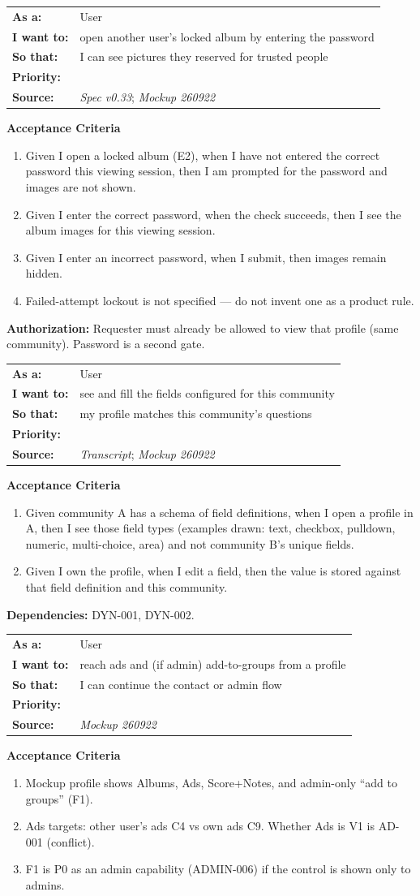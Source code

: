 \documentclass[11pt,a4paper]{article}
\makeatletter
\newcommand{\priPzero}{\colorbox{p0}{\makebox[4.6em]{\textcolor{white}{\scriptsize\bfseries P0 V1}}}}
\newcommand{\priPone}{\colorbox{p1}{\makebox[4.6em]{\textcolor{white}{\scriptsize\bfseries P1}}}}
\newcommand{\srcSpec}{\textit{Spec v0.33}}
\newcommand{\srcTx}{\textit{Transcript}}
\newcommand{\srcMock}{\textit{Mockup 260922}}
\newenvironment{story}[1]{%
  \Needspace{10\baselineskip}%
  \vspace{0.7em}%
  \noindent
  \colorbox{navy}{\makebox[\dimexpr\textwidth-2\fboxsep\relax][l]{\textcolor{white}{\bfseries\ #1}}}%
  \par\vspace{0.35em}%
}{\par\vspace{0.55em}}
\newcommand{\storymeta}[5]{%
  \noindent
  \begin{tabularx}{\textwidth}{@{}>{\bfseries}l X@{}}
    As a: & #1 \\
    I want to: & #2 \\
    So that: & #3 \\
    Priority: & #4 \\
    Source: & #5 \\
  \end{tabularx}
  \par\vspace{0.3em}
}
\newcommand{\achead}{\noindent\textbf{Acceptance Criteria}\par}
\newcommand{\authz}[1]{\noindent\textbf{Authorization:} #1\par}
\newcommand{\deps}[1]{\noindent\textbf{Dependencies:} #1\par}
\makeatother
\begin{document}
\begin{story}{PROF-014 --- View another user's locked album}
\storymeta{User}{open another user's locked album by entering the password}{I can see pictures they reserved for trusted people}{\priPzero}{\srcSpec; \srcMock}
\achead
\begin{enumerate}
  \item Given I open a locked album (E2), when I have not entered the correct password this viewing session, then I am prompted for the password and images are not shown.
  \item Given I enter the correct password, when the check succeeds, then I see the album images for this viewing session.
  \item Given I enter an incorrect password, when I submit, then images remain hidden.
  \item Failed-attempt lockout is not specified --- do not invent one as a product rule.
\end{enumerate}
\authz{Requester must already be allowed to view that profile (same community). Password is a second gate.}
\end{story}

\begin{story}{PROF-015 --- Dynamic fields render on the profile}
\storymeta{User}{see and fill the fields configured for this community}{my profile matches this community's questions}{\priPzero}{\srcTx; \srcMock}
\achead
\begin{enumerate}
  \item Given community A has a schema of field definitions, when I open a profile in A, then I see those field types (examples drawn: text, checkbox, pulldown, numeric, multi-choice, area) and not community B's unique fields.
  \item Given I own the profile, when I edit a field, then the value is stored against that field definition and this community.
\end{enumerate}
\deps{DYN-001, DYN-002.}
\end{story}

\begin{story}{PROF-016 --- Ads and groups shortcuts on profile}
\storymeta{User}{reach ads and (if admin) add-to-groups from a profile}{I can continue the contact or admin flow}{\priPone}{\srcMock}
\achead
\begin{enumerate}
  \item Mockup profile shows Albums, Ads, Score+Notes, and admin-only ``add to groups'' (F1).
  \item Ads targets: other user's ads C4 vs own ads C9. Whether Ads is V1 is AD-001 (conflict).
  \item F1 is P0 as an admin capability (ADMIN-006) if the control is shown only to admins.
\end{enumerate}
\end{story}
\end{document}
